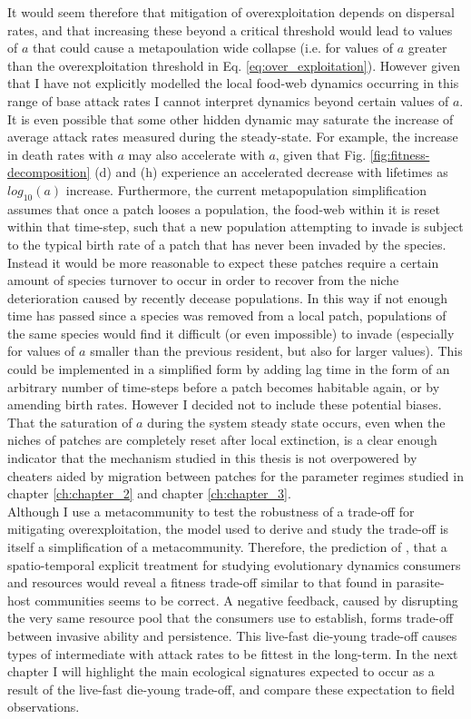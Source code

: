 \documentclass[a4paper]{report}
\begin{document}
  It would seem therefore that mitigation of overexploitation depends on dispersal rates, and that increasing these beyond a critical threshold would lead to values of $a$ that could cause a metapoulation wide collapse (i.e. for values of $a$ greater than the overexploitation threshold in Eq. \eqref{eq:over_exploitation}). However given that I have not explicitly modelled the local food-web dynamics occurring in this range of base attack rates I cannot interpret dynamics beyond certain values of $a$. It is even possible that some other hidden dynamic may saturate the increase of average attack rates measured during the steady-state. For example, the increase in death rates with $a$ may also accelerate with $a$, given that Fig. \ref{fig:fitness-decomposition} (d) and (h) experience an accelerated decrease with lifetimes as $log_{10}(a)$ increase. Furthermore, the current metapopulation simplification assumes that once a patch looses a population, the food-web within it is reset within that time-step, such that a new population attempting to invade is subject to the typical birth rate of a patch that has never been invaded by the species. Instead it would be more reasonable to expect these patches require a certain amount of species turnover to occur in order to recover from the niche deterioration caused by recently decease populations. In this way if not enough time has passed since a species was removed from a local patch, populations of the same species would find it difficult (or even impossible) to invade (especially for values of $a$ smaller than the previous resident, but also for larger values). This could be implemented in a simplified form by adding lag time in the form of an arbitrary number of time-steps before a patch becomes habitable again, or by amending  birth rates. However I decided not to include these potential biases. That the saturation of $a$ during the system steady state occurs, even when the niches of patches are completely reset after local extinction, is a clear enough indicator that the mechanism studied in this thesis is not overpowered by cheaters aided by migration between patches for the parameter regimes studied in chapter \ref{ch:chapter_2} and chapter \ref{ch:chapter_3}. \\
  
  Although I use a metacommunity to test the robustness of a trade-off for mitigating overexploitation, the model used to derive and study the trade-off is itself a simplification of a metacommunity. Therefore, the prediction of \citep{Goodnight2008}, that a spatio-temporal explicit treatment for studying evolutionary dynamics consumers and resources would reveal a fitness trade-off similar to that found in parasite-host communities seems to be correct. A negative feedback, caused by disrupting the very same resource pool that the consumers use to establish, forms trade-off between invasive ability and persistence. This live-fast die-young trade-off causes types of intermediate with attack rates to be fittest in the long-term. In the next chapter I will highlight the main ecological signatures expected to occur as a result of the live-fast die-young trade-off, and compare these expectation to field observations.
  
\end{document}
